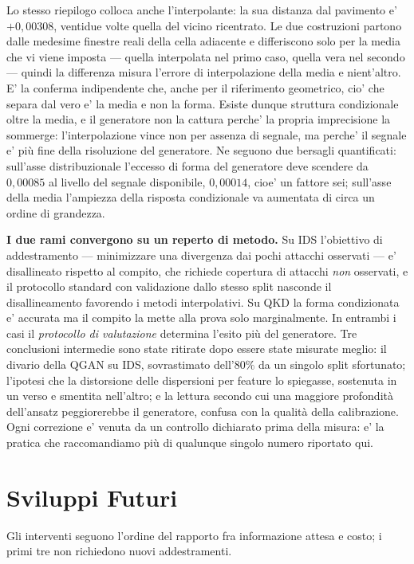 \documentclass[10pt,conference,a4paper,twocolumn]{IEEEtran}
\begin{document}
Lo stesso riepilogo colloca anche l'interpolante: la sua distanza dal pavimento e' $+0{,}00308$, ventidue volte quella del vicino ricentrato. Le due costruzioni partono dalle medesime finestre reali della cella adiacente e differiscono solo per la media che vi viene imposta — quella interpolata nel primo caso, quella vera nel secondo — quindi la differenza misura l'errore di interpolazione della media e nient'altro. E' la conferma indipendente che, anche per il riferimento geometrico, cio' che separa dal vero e' la media e non la forma. Esiste dunque struttura condizionale oltre la media, e il generatore non la cattura perche' la propria imprecisione la sommerge: l'interpolazione vince non per assenza di segnale, ma perche' il segnale e' più fine della risoluzione del generatore. Ne seguono due bersagli quantificati: sull'asse distribuzionale l'eccesso di forma del generatore deve scendere da $0{,}00085$ al livello del segnale disponibile, $0{,}00014$, cioe' un fattore sei; sull'asse della media l'ampiezza della risposta condizionale va aumentata di circa un ordine di grandezza.

\textbf{I due rami convergono su un reperto di metodo.} Su IDS l'obiettivo di addestramento — minimizzare una divergenza dai pochi attacchi osservati — e' disallineato rispetto al compito, che richiede copertura di attacchi \emph{non} osservati, e il protocollo standard con validazione dallo stesso split nasconde il disallineamento favorendo i metodi interpolativi. Su QKD la forma condizionata e' accurata ma il compito la mette alla prova solo marginalmente. In entrambi i casi il \emph{protocollo di valutazione} determina l'esito più del generatore. Tre conclusioni intermedie sono state ritirate dopo essere state misurate meglio: il divario della QGAN su IDS, sovrastimato dell'$80\%$ da un singolo split sfortunato; l'ipotesi che la distorsione delle dispersioni per feature lo spiegasse, sostenuta in un verso e smentita nell'altro; e la lettura secondo cui una maggiore profondità dell'ansatz peggiorerebbe il generatore, confusa con la qualità della calibrazione. Ogni correzione e' venuta da un controllo dichiarato prima della misura: e' la pratica che raccomandiamo più di qualunque singolo numero riportato qui.

\section{Sviluppi Futuri}

Gli interventi seguono l'ordine del rapporto fra informazione attesa e costo; i primi tre non richiedono nuovi addestramenti.
\end{document}
